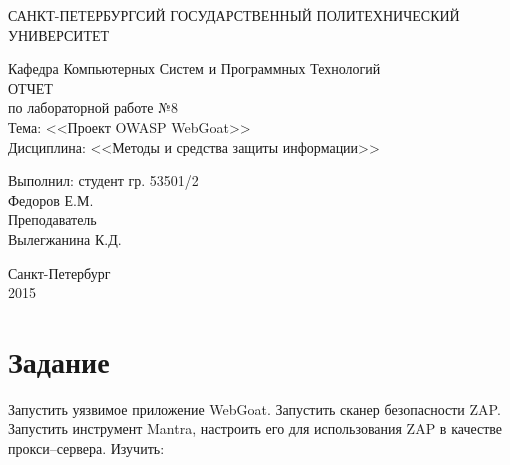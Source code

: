 \documentclass[utf8x, 12pt]{G7-32}
\begin{document}
\frontmatter 


\begin{center} 

\large САНКТ-ПЕТЕРБУРГСИЙ ГОСУДАРСТВЕННЫЙ ПОЛИТЕХНИЧЕСКИЙ УНИВЕРСИТЕТ

\large Кафедра Компьютерных Систем и Программных Технологий \\[5.5cm] 

\huge ОТЧЕТ \\[0.6cm] %
\large по лабораторной работе №8\\
\large Тема: <<Проект OWASP WebGoat>>\\
\large Дисциплина: <<Методы и средства защиты информации>>\\[3.7cm]

\end{center} 

\begin{flushright}
Выполнил: студент гр. 53501/2 \\
Федоров Е.М. \\[1.2cm]


Преподаватель \\
Вылегжанина К.Д.
\end{flushright}


\vfill 

\begin{center} 
\large Санкт-Петербург \\
2015
\end{center} 

\thispagestyle{empty}



\thispagestyle{empty}
\setcounter{page}{0}
\tableofcontents
\clearpage
\mainmatter


\chapter{Задание}
Запустить уязвимое приложение WebGoat. Запустить сканер безопасности ZAP. Запустить инструмент Mantra, настроить его для использования ZAP в качестве прокси--сервера. Изучить:
\end{document}
